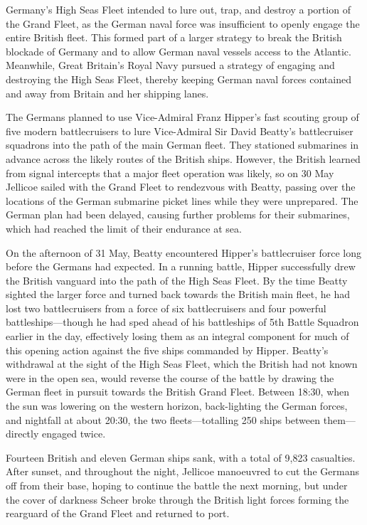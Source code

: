 \documentclass[a4paper,]{book}
\begin{document}
Germany's High Seas Fleet intended to lure out, trap, and destroy a portion of the Grand Fleet, as the German naval force was insufficient to openly engage the entire British fleet. This formed part of a larger strategy to break the British blockade of Germany and to allow German naval vessels access to the Atlantic. Meanwhile, Great Britain's Royal Navy pursued a strategy of engaging and destroying the High Seas Fleet, thereby keeping German naval forces contained and away from Britain and her shipping lanes.

The Germans planned to use Vice-Admiral Franz Hipper's fast scouting group of five modern battlecruisers to lure Vice-Admiral Sir David Beatty's battlecruiser squadrons into the path of the main German fleet. They stationed submarines in advance across the likely routes of the British ships. However, the British learned from signal intercepts that a major fleet operation was likely, so on 30 May Jellicoe sailed with the Grand Fleet to rendezvous with Beatty, passing over the locations of the German submarine picket lines while they were unprepared. The German plan had been delayed, causing further problems for their submarines, which had reached the limit of their endurance at sea.

On the afternoon of 31 May, Beatty encountered Hipper's battlecruiser force long before the Germans had expected. In a running battle, Hipper successfully drew the British vanguard into the path of the High Seas Fleet. By the time Beatty sighted the larger force and turned back towards the British main fleet, he had lost two battlecruisers from a force of six battlecruisers and four powerful battleships—though he had sped ahead of his battleships of 5th Battle Squadron earlier in the day, effectively losing them as an integral component for much of this opening action against the five ships commanded by Hipper. Beatty's withdrawal at the sight of the High Seas Fleet, which the British had not known were in the open sea, would reverse the course of the battle by drawing the German fleet in pursuit towards the British Grand Fleet. Between 18:30, when the sun was lowering on the western horizon, back-lighting the German forces, and nightfall at about 20:30, the two fleets—totalling 250 ships between them—directly engaged twice.

Fourteen British and eleven German ships sank, with a total of 9,823 casualties. After sunset, and throughout the night, Jellicoe manoeuvred to cut the Germans off from their base, hoping to continue the battle the next morning, but under the cover of darkness Scheer broke through the British light forces forming the rearguard of the Grand Fleet and returned to port.
\end{document}
